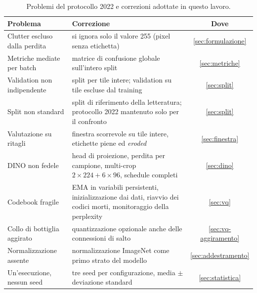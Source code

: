 \begin{table}[t]
  \centering
  \small
  \caption[Problemi del protocollo 2022 e correzioni adottate]{Problemi del protocollo 2022 e
    correzioni adottate in questo lavoro.}
  \label{tab:correzioni}
  \begin{tabular}{|p{4.4cm}|p{6.0cm}|c|}
    \hline
    \textbf{Problema} & \textbf{Correzione} & \textbf{Dove} \\
    \hline
    Clutter escluso dalla perdita & si ignora solo il valore 255 (pixel senza etichetta) & \cref{sec:formulazione} \\
    \hline
    Metriche mediate per batch & matrice di confusione globale sull'intero split & \cref{sec:metriche} \\
    \hline
    Validation non indipendente & split per tile intere; validation su tile escluse dal training & \cref{sec:split} \\
    \hline
    Split non standard & split di riferimento della letteratura; protocollo 2022 mantenuto solo per il confronto & \cref{sec:split} \\
    \hline
    Valutazione su ritagli & finestra scorrevole su tile intere, etichette piene ed \emph{eroded} & \cref{sec:finestra} \\
    \hline
    DINO non fedele & head di proiezione, perdita per campione, multi-crop $2\times224 + 6\times96$, schedule completi & \cref{sec:dino} \\
    \hline
    Codebook fragile & EMA in variabili persistenti, inizializzazione dai dati, riavvio dei codici morti, monitoraggio della perplexity & \cref{sec:vq} \\
    \hline
    Collo di bottiglia aggirato & quantizzazione opzionale anche delle connessioni di salto & \cref{sec:vq-aggiramento} \\
    \hline
    Normalizzazione assente & normalizzazione ImageNet come primo strato del modello & \cref{sec:addestramento} \\
    \hline
    Un'esecuzione, nessun seed & tre seed per configurazione, media $\pm$ deviazione standard & \cref{sec:statistica} \\
    \hline
  \end{tabular}
\end{table}
